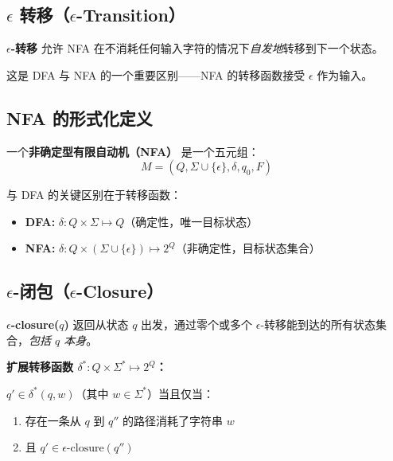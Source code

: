 \documentclass[12pt,a4paper]{ctexart}
\newcommand{\term}[1]{\textbf{\textcolor{mainblue}{#1}}}
\begin{document}
\subsection{$\epsilon$ 转移（$\epsilon$-Transition）}

\begin{keybox}
  \term{$\epsilon$-转移} 允许 NFA 在不消耗任何输入字符的情况下\emph{自发地}转移到下一个状态。
\end{keybox}

这是 DFA 与 NFA 的一个重要区别——NFA 的转移函数接受 $\epsilon$ 作为输入。

\subsection{NFA 的形式化定义}

\begin{keybox}
  一个\term{非确定型有限自动机（NFA）} 是一个五元组：
  $$M = (Q, \Sigma \cup \{\epsilon\}, \delta, q_0, F)$$

  与 DFA 的关键区别在于转移函数：
  \begin{itemize}
    \item \textbf{DFA:} $\delta: Q \times \Sigma \mapsto Q$（确定性，唯一目标状态）
    \item \textbf{NFA:} $\delta: Q \times (\Sigma \cup \{\epsilon\}) \mapsto 2^Q$（非确定性，目标状态集合）
  \end{itemize}
\end{keybox}

\subsection{$\epsilon$-闭包（$\epsilon$-Closure）}

\begin{keybox}
  \term{$\epsilon$-closure($q$)} 返回从状态 $q$ 出发，通过零个或多个 $\epsilon$-转移能到达的所有状态集合，\emph{包括 $q$ 本身}。
\end{keybox}

\textbf{扩展转移函数 $\delta^*: Q \times \Sigma^* \mapsto 2^Q$：}

$q' \in \delta^*(q, w)$（其中 $w \in \Sigma^*$）当且仅当：
\begin{enumerate}
  \item 存在一条从 $q$ 到 $q''$ 的路径消耗了字符串 $w$
  \item 且 $q' \in \text{$\epsilon$-closure}(q'')$
\end{enumerate}
\end{document}
